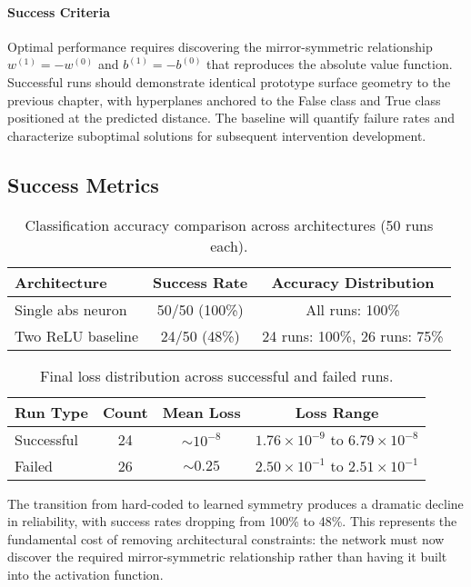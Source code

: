 \paragraph{Success Criteria}
Optimal performance requires discovering the mirror-symmetric relationship $w^{(1)} = -w^{(0)}$ and $b^{(1)} = -b^{(0)}$ that reproduces the absolute value function. Successful runs should demonstrate identical prototype surface geometry to the previous chapter, with hyperplanes anchored to the False class and True class positioned at the predicted distance. The baseline will quantify failure rates and characterize suboptimal solutions for subsequent intervention development.


\subsection*{Success Metrics}

\begin{table}[ht]
\centering
\caption{Classification accuracy comparison across architectures (50 runs each).}
\label{tab:relu1-baseline-accuracy}
\begin{tabular}{lcc}
\toprule
Architecture & Success Rate & Accuracy Distribution \\
\midrule
Single abs neuron & 50/50 (100\%) & All runs: 100\% \\
Two ReLU baseline & 24/50 (48\%) & 24 runs: 100\%, 26 runs: 75\% \\
\bottomrule
\end{tabular}
\end{table}

\begin{table}[ht]
\centering
\caption{Final loss distribution across successful and failed runs.}
\label{tab:relu1-baseline-loss}
\begin{tabular}{lccc}
\toprule
Run Type & Count & Mean Loss & Loss Range \\
\midrule
Successful & 24 & $\sim10^{-8}$ & $1.76 \times 10^{-9}$ to $6.79 \times 10^{-8}$ \\
Failed & 26 & $\sim0.25$ & $2.50 \times 10^{-1}$ to $2.51 \times 10^{-1}$ \\
\bottomrule
\end{tabular}
\end{table}

The transition from hard-coded to learned symmetry produces a dramatic decline in reliability, with success rates dropping from 100\% to 48\%. This represents the fundamental cost of removing architectural constraints: the network must now discover the required mirror-symmetric relationship rather than having it built into the activation function.

